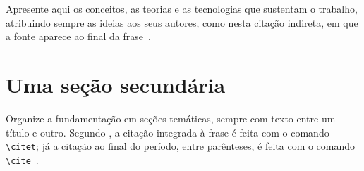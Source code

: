\documentclass[tcc,capa]{texifsap}
\begin{document}
%

Apresente aqui os conceitos, as teorias e as tecnologias que sustentam
o trabalho, atribuindo sempre as ideias aos seus autores, como nesta
citação indireta, em que a fonte aparece ao final da
frase~\cite{Moore:1979:MAI}.

\section{Uma seção secundária}

Organize a fundamentação em seções temáticas, sempre com texto entre um
título e outro. Segundo \citet{vonNeumann:1966:TSR}, a citação
integrada à frase é feita com o comando \verb|\citet|; já a citação ao
final do período, entre parênteses, é feita com o comando
\verb|\cite|~\cite{Dijkstra:1968}.
\end{document}
